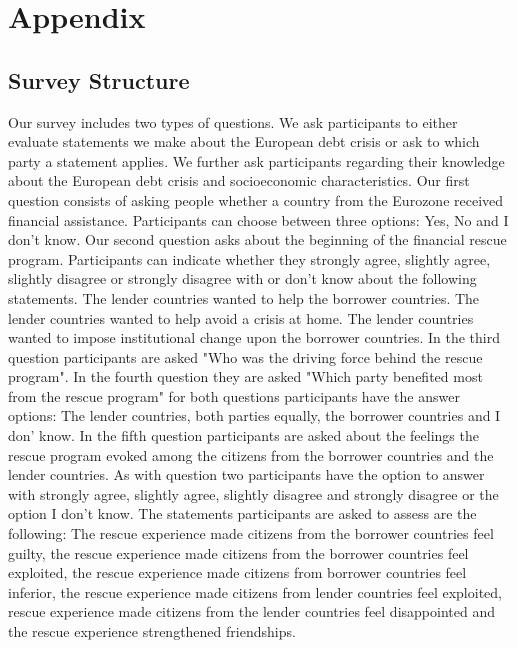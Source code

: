 \section{Appendix} \label{appendix}
\subsection{Survey Structure}
Our survey includes two types of questions. We ask participants to either evaluate statements we make about the European debt crisis or ask to which party a statement applies. We further ask participants regarding their knowledge about the European debt crisis and socioeconomic characteristics. Our first question consists of asking people whether a country from the Eurozone received financial assistance. Participants can choose between three options: Yes, No and I don't know. Our second question asks about the beginning of the financial rescue program. 
Participants can indicate whether they strongly agree, slightly agree, slightly disagree or strongly disagree with or don't know about the following statements. 
The lender countries wanted to help the borrower countries. The lender countries wanted to help avoid a crisis at home. The lender countries wanted to impose institutional change upon the borrower countries. 
In the third question participants are asked "Who was the driving force behind the rescue program". In the fourth question they are asked "Which party benefited most from the rescue program" for both questions participants have the answer options: The lender countries, both parties equally, the borrower countries and I don' know. In the fifth question participants are asked about the feelings the rescue program evoked among the citizens from the borrower countries and the lender countries. As with question two participants have the option to answer with strongly agree, slightly agree, slightly disagree and strongly disagree or the option I don't know. The statements participants are asked to assess are the following: The rescue experience made citizens from the borrower countries feel guilty, the rescue experience made citizens from the borrower countries feel exploited, the rescue experience made citizens from borrower countries feel inferior, the rescue experience made citizens from lender countries feel exploited, rescue experience made citizens from the lender countries feel disappointed and the rescue experience strengthened friendships. %
